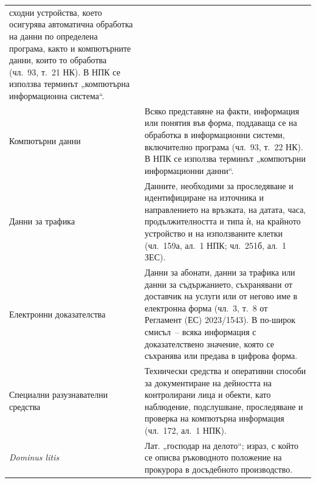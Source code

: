 {\begin{longtable}{@{}T{4.1cm}L{12.7cm}@{}}
сходни устройства, което осигурява автоматична обработка на данни по определена програма,
както и компютърните данни, които то обработва (чл.~93, т.~21 НК). В НПК се използва
терминът „компютърна информационна система“.\\
Компютърни данни & Всяко представяне на факти, информация или понятия във форма,
поддаваща се на обработка в информационни системи, включително програма (чл.~93, т.~22
НК). В НПК се използва терминът „компютърни информационни данни“.\\
Данни за трафика & Данните, необходими за проследяване и идентифициране на източника и
направлението на връзката, на датата, часа, продължителността и типа ѝ, на крайното
устройство и на използваните клетки (чл.~159а, ал.~1 НПК; чл.~251б, ал.~1 ЗЕС).\\
Електронни доказателства & Данни за абонати, данни за трафика или данни за съдържанието,
съхранявани от доставчик на услуги или от негово име в електронна форма (чл.~3, т.~8 от
Регламент (ЕС) 2023/1543). В по-широк смисъл~-- всяка информация с доказателствено
значение, която се съхранява или предава в цифрова форма.\\
Специални разузнавателни средства & Технически средства и оперативни способи за
документиране на дейността на контролирани лица и обекти, като наблюдение, подслушване,
проследяване и проверка на компютърна информация (чл.~172, ал.~1 НПК).\\
\textit{Dominus litis} & Лат. „господар на делото“; израз, с който се описва ръководното
положение на прокурора в досъдебното производство.\\
\end{longtable}
}
\addtocounter{table}{-1}
